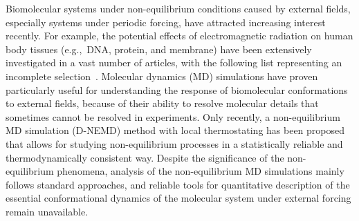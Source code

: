 \documentclass[journal=jctcce,manuscript=article]{achemso}
\begin{document}
Biomolecular systems under non-equilibrium conditions caused by external fields, especially
systems under periodic forcing, have attracted increasing
interest recently.  For example, the potential effects of electromagnetic
radiation on  human body tissues (e.g.,~DNA, protein, and membrane)  have been extensively
investigated in a vast number of articles, with the following list  representing an incomplete selection~\cite{bohr2000microwave, bohr2000microwave-1, dePomerai2000cell,
  dePomerai2003microwave, mancinelli2004non, inskip2001cellular, bekard2013electric, budi2005electric,
  budi2007effect, budi2008comparative, astrakas2012structural,
  damm2012can, english2009nonequilibrium, solomentsev2012effects}.  Molecular dynamics (MD) simulations have proven particularly useful for understanding
the response of biomolecular conformations to external fields, because of their ability to  resolve molecular
details that sometimes cannot be resolved in experiments. Only
recently, a non-equilibrium MD simulation (D-NEMD) method with local thermostating has been proposed~\cite{wang2014exploring} that allows for studying 
non-equilibrium processes in a statistically reliable and thermodynamically consistent way. 
Despite the significance of the non-equilibrium phenomena, 
analysis of the non-equilibrium MD simulations mainly follows standard approaches, and reliable tools for quantitative description of
the essential conformational dynamics of the molecular system under external forcing remain unavailable. 

\end{document}
